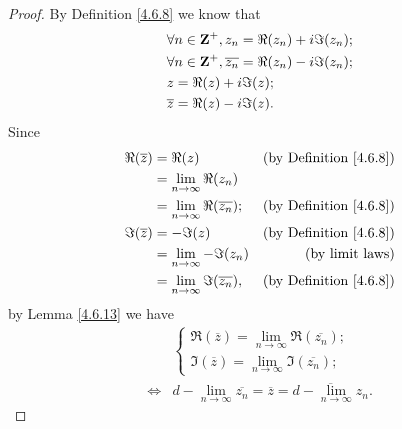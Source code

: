 \begin{proof}
    By Definition \ref{4.6.8} we know that
    \begin{align*}
         & \forall n \in \mathbf{Z}^+, z_n = \Re(z_n) + i \Im(z_n);            \\
         & \forall n \in \mathbf{Z}^+, \overline{z_n} = \Re(z_n) - i \Im(z_n); \\
         & z = \Re(z) + i \Im(z);                                      \\
         & \overline{z} = \Re(z) - i \Im(z).
    \end{align*}
    Since
    \begin{align*}
        \Re(\overline{z}) & = \Re(z)                                   & \text{(by Definition \ref{4.6.8})} \\
                          & = \lim_{n \to \infty} \Re(z_n)                                                  \\
                          & = \lim_{n \to \infty} \Re(\overline{z_n}); & \text{(by Definition \ref{4.6.8})} \\
        \Im(\overline{z}) & = -\Im(z)                                  & \text{(by Definition \ref{4.6.8})} \\
                          & = \lim_{n \to \infty} -\Im(z_n)            & \text{(by limit laws)}             \\
                          & = \lim_{n \to \infty} \Im(\overline{z_n}), & \text{(by Definition \ref{4.6.8})}
    \end{align*}
    by Lemma \ref{4.6.13} we have
    \begin{align*}
             & \begin{cases}
                   \Re(\overline{z}) = \lim_{n \to \infty} \Re(\overline{z_n}); \\
                   \Im(\overline{z}) = \lim_{n \to \infty} \Im(\overline{z_n});
               \end{cases}                                    \\
        \iff & d - \lim_{n \to \infty} \overline{z_n} = \overline{z} = \overline{d - \lim_{n \to \infty} z_n}.
    \end{align*}


\end{proof}
